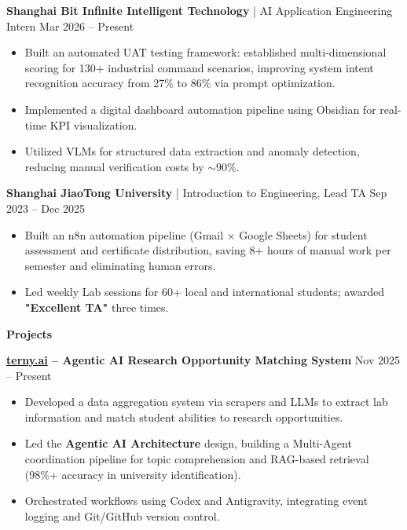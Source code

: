 \documentclass[11pt]{article}
\begin{document}
\textbf{Shanghai Bit Infinite Intelligent Technology} | AI Application Engineering Intern \hfill Mar 2026 -- Present  
\begin{itemize}[itemsep=0pt, parsep=0pt, topsep=0pt, partopsep=0pt, leftmargin=15pt]
    \item Built an automated UAT testing framework: established multi-dimensional scoring for 130+ industrial command scenarios, improving system intent recognition accuracy from 27\% to 86\% via prompt optimization.
    \item Implemented a digital dashboard automation pipeline using Obsidian for real-time KPI visualization.
    \item Utilized VLMs for structured data extraction and anomaly detection, reducing manual verification costs by $\sim$90\%.
\end{itemize}

\vspace{0pt}
\textbf{Shanghai JiaoTong University} | Introduction to Engineering, Lead TA \hfill Sep 2023 -- Dec 2025  
\begin{itemize}[itemsep=0pt, parsep=0pt, topsep=0pt, partopsep=0pt, leftmargin=15pt]
    \item Built an n8n automation pipeline (Gmail $\times$ Google Sheets) for student assessment and certificate distribution, saving 8+ hours of manual work per semester and eliminating human errors.
    \item Led weekly Lab sessions for 60+ local and international students; awarded \textbf{"Excellent TA"} three times.
\end{itemize}

\vspace{-5pt}
\begin{center}
    \textbf{Projects} \\
    \vspace{-5pt}
    \hrulefill
\end{center}
\vspace{-5pt}

\textbf{\href{https://terny.ai/}{terny.ai} -- Agentic AI Research Opportunity Matching System} \hfill Nov 2025 -- Present  
\begin{itemize}[itemsep=0pt, parsep=0pt, topsep=1pt, partopsep=0pt, leftmargin=15pt]
    \item Developed a data aggregation system via scrapers and LLMs to extract lab information and match student abilities to research opportunities.
    \item Led the \textbf{Agentic AI Architecture} design, building a Multi-Agent coordination pipeline for topic comprehension and RAG-based retrieval (98\%+ accuracy in university identification).
    \item Orchestrated workflows using Codex and Antigravity, integrating event logging and Git/GitHub version control.
\end{itemize}
\end{document}
